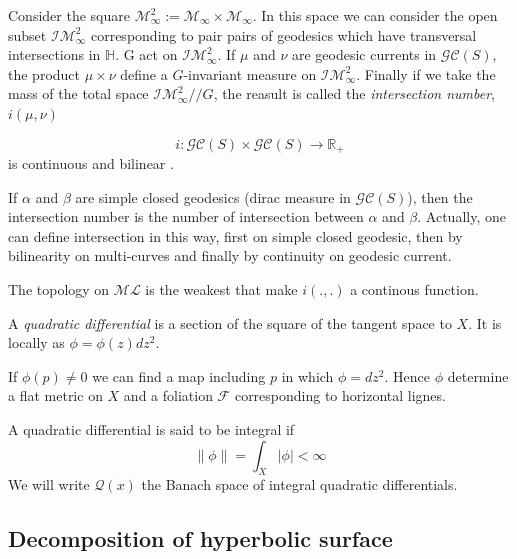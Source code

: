 \begin{dfnt}
Consider the square $\mathcal{M}_\infty^2 := \mathcal{M}_\infty \times \mathcal{M}_\infty $. In this space we can consider the open subset $\mathcal{IM}^2_\infty$ corresponding to pair pairs of geodesics which have transversal intersections in $\mathbb{H}$. G act on $\mathcal{IM}^2_\infty$.
If $\mu$ and $\nu$ are geodesic currents in $\mathcal{GC}(S)$, the product $\mu \times \nu$ define a $G$-invariant measure on $\mathcal{IM}^2_\infty$.
Finally if we take the mass of the total space $\mathcal{IM}^2_\infty // G$, the reasult is called the \emph{intersection number}, $i(\mu,\nu)$
\end{dfnt}

\begin{prop}
\[
i: \mathcal{GC}(S) \times \mathcal{GC}(S) \to \mathbb{R}_+
\]
is continuous and bilinear \cite{Bonahon1988}.
\end{prop}

\begin{rmq}
If $\alpha$ and $\beta$ are simple closed geodesics (dirac measure in $\mathcal{GC}(S)$), then the intersection number is the number of intersection between $\alpha$ and $\beta$.
Actually, one can define intersection in this way, first on simple closed geodesic, then by bilinearity on multi-curves and finally by continuity on geodesic current.
\end{rmq}

\begin{rmq}
The topology on $\mathcal{ML}$ is the weakest that make $i(.,.)$ a continous function.
\end{rmq}

\begin{dfnt}
A \emph{quadratic differential} is a section of the square of the tangent space to $X$. It is locally as $\phi= \phi(z) dz^2$.
\end{dfnt}

\begin{rmq}
If $\phi(p) \neq 0$ we can find a map including $p$ in which $\phi = dz^2$.
Hence $\phi$ determine a flat metric on $X$ and a foliation $\mathcal{F}$ corresponding to horizontal lignes.
\end{rmq}


A quadratic differential is said to be integral if\[
 \| \phi \| = \int_X | \phi | < \infty
\]
We will write $\mathcal{Q}(x)$ the Banach space of integral quadratic differentials.

\subsection{Decomposition of hyperbolic surface}

